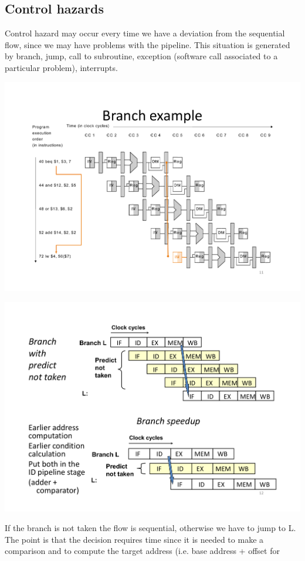 \subsection{Control hazards}
Control hazard may occur every time we have a deviation from the sequential
flow, since we may have problems with the pipeline. This situation is generated
by branch, jump, call to subroutine, exception (software call associated to a
particular problem), interrupts.
\begin{center}
  \includegraphics[width=0.9\linewidth]{img/img3/mips8}
\end{center}
\begin{center}
  \includegraphics[width=0.9\linewidth]{img/img3/mips9}
\end{center}
If the branch is not taken the flow is sequential, otherwise we have to jump to
L. The point is that the decision requires time since it is needed to make a
comparison and to compute the target address (i.e. base address + offset for
